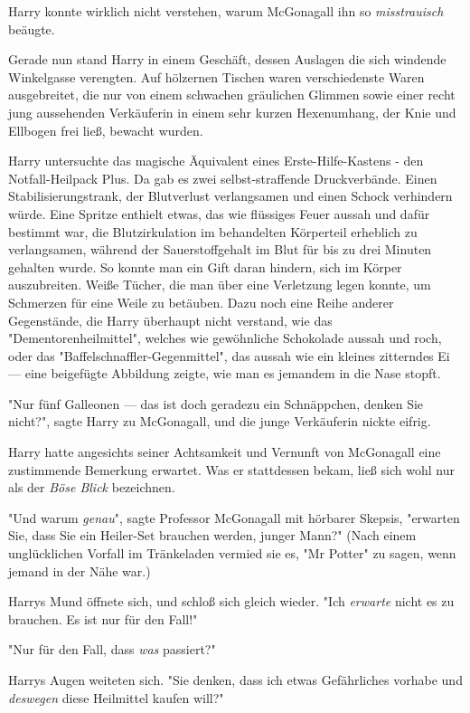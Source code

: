 {Harry konnte wirklich nicht verstehen, warum McGonagall ihn so \emph{misstrauisch} beäugte.

Gerade nun stand Harry in einem Geschäft, dessen Auslagen die sich windende Winkelgasse verengten. Auf hölzernen Tischen waren verschiedenste Waren ausgebreitet, die nur von einem schwachen gräulichen Glimmen sowie einer recht jung aussehenden Verkäuferin in einem sehr kurzen Hexenumhang, der Knie und Ellbogen frei ließ, bewacht wurden.

Harry untersuchte das magische Äquivalent eines Erste-Hilfe-Kastens - den Notfall-Heilpack Plus. Da gab es zwei selbst-straffende Druckverbände. Einen Stabilisierungstrank, der Blutverlust verlangsamen und einen Schock verhindern würde. Eine Spritze enthielt etwas, das wie flüssiges Feuer aussah und dafür bestimmt war, die Blutzirkulation im behandelten Körperteil erheblich zu verlangsamen, während der Sauerstoffgehalt im Blut für bis zu drei Minuten gehalten wurde. So konnte man ein Gift daran hindern, sich im Körper auszubreiten. Weiße Tücher, die man über eine Verletzung legen konnte, um Schmerzen für eine Weile zu betäuben. Dazu noch eine Reihe anderer Gegenstände, die Harry überhaupt nicht verstand, wie das "Dementorenheilmittel", welches wie gewöhnliche Schokolade aussah und roch, oder das "Baffelschnaffler-Gegenmittel", das aussah wie ein kleines zitterndes Ei --- eine beigefügte Abbildung zeigte, wie man es jemandem in die Nase stopft.

"Nur fünf Galleonen --- das ist doch geradezu ein Schnäppchen, denken Sie nicht?", sagte Harry zu McGonagall, und die junge Verkäuferin nickte eifrig.

Harry hatte angesichts seiner Achtsamkeit und Vernunft von McGonagall eine zustimmende Bemerkung erwartet. Was er stattdessen bekam, ließ sich wohl nur als der \emph{Böse Blick} bezeichnen.

"Und warum \emph{genau}", sagte Professor McGonagall mit hörbarer Skepsis, "erwarten Sie, dass Sie ein Heiler-Set brauchen werden, junger Mann?" (Nach einem unglücklichen Vorfall im Tränkeladen vermied sie es, "Mr Potter" zu sagen, wenn jemand in der Nähe war.)

Harrys Mund öffnete sich, und schloß sich gleich wieder. "Ich \emph{erwarte} nicht es zu brauchen. Es ist nur für den Fall!"

"Nur für den Fall, dass \emph{was} passiert?"

Harrys Augen weiteten sich. "Sie denken, dass ich etwas Gefährliches vorhabe und \emph{deswegen} diese Heilmittel kaufen will?"

}
